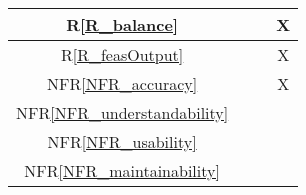 \documentclass[12pt]{article}
\newcommand{\rref}[1]{R\ref{#1}}
\newcommand{\nfrref}[1]{NFR\ref{#1}}
\begin{document}
\begin{table}[h!]
{\begin{tabular}{|c|c|c|c|}
      \rref{R_balance}               &                &                 & X              \\ \hline %
      \rref{R_feasOutput}            &                &                 & X              \\ \hline %
      \nfrref{NFR_accuracy}          &                &                 & X              \\ \hline %
      \nfrref{NFR_understandability} &                &                 &                \\ \hline %
      \nfrref{NFR_usability}         &                &                 &                \\ \hline %
      \nfrref{NFR_maintainability}   &                &                 &                \\ \hline %

\end{tabular}}
\end{table}
\end{document}
